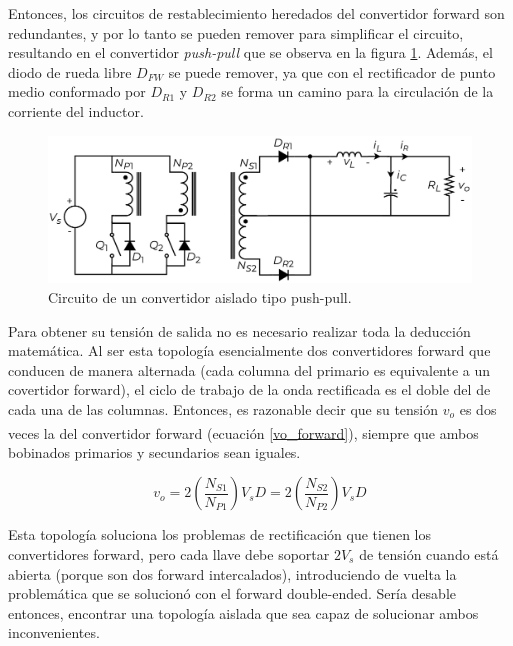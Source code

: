 Entonces, los circuitos de restablecimiento heredados del convertidor forward son redundantes, y por lo tanto se pueden remover para simplificar el circuito, resultando en el {\Medium convertidor \textit{push-pull}} que se observa en la figura \ref{pushpull}. Además, el diodo de rueda libre $D_{FW}$ se puede remover, ya que con el rectificador de punto medio conformado por $D_{R1}$ y $D_{R2}$ se forma un camino para la circulación de la corriente del inductor.\\

\begin{figure}[h]
    \centering
    \includegraphics[scale=0.6]{Imagenes/Push-Pull.pdf}
    \caption{Circuito de un convertidor aislado tipo push-pull.}
    \label{pushpull}
\end{figure}

Para obtener su tensión de salida no es necesario realizar toda la deducción matemática. Al ser esta topología esencialmente dos convertidores forward que conducen de manera alternada (cada columna del primario es equivalente a un covertidor forward), el ciclo de trabajo de la onda rectificada es el doble del de cada una de las columnas. Entonces, es razonable decir que su tensión $v_o$ es dos veces la del convertidor forward (ecuación \ref{vo_forward})\textsuperscript{\cite{PotenciaHart}}, siempre que ambos bobinados primarios y secundarios sean iguales.

\begin{equation}\label{vo_pushpull}
    \boxed{
        v_o = 2\left(\frac{N_{S1}}{N_{P1}}\right)V_sD = 2\left(\frac{N_{S2}}{N_{P2}}\right)V_sD
    }
\end{equation}

Esta topología soluciona los problemas de rectificación que tienen los convertidores forward, pero cada llave debe soportar $2V_s$ de tensión cuando está abierta (porque son dos forward intercalados), introduciendo de vuelta la problemática que se solucionó con el forward double-ended. Sería desable entonces, encontrar una topología aislada que sea capaz de solucionar ambos inconvenientes.\\

